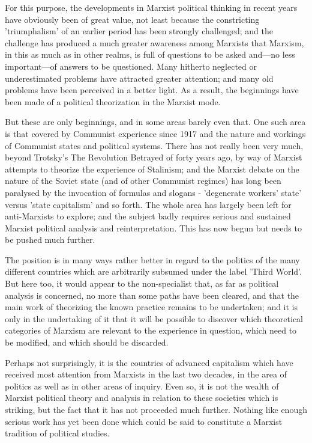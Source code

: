 For this purpose, the developments in Marxist political thinking in recent years have obviously been of great value, not least because the constricting 'triumphalism' of an earlier period has been strongly challenged; and the challenge has produced a much greater awareness among Marxists that Marxism, in this as much as in other realms, is full of questions to be asked and—no less important—of answers to be questioned. Many hitherto neglected or underestimated problems have attracted greater attention; and many old problems have been perceived in a better light. As a result, the beginnings have been made of a political theorization in the Marxist mode.

But these are only beginnings, and in some areas barely even that. One such area is that covered by Communist experience since 1917 and the nature and workings of Communist states and political systems. There has not really been very much, beyond Trotsky's The Revolution Betrayed of forty years ago, by way of Marxist attempts to theorize the experience of Stalinism; and the Marxist debate on the nature of the Soviet state (and of other Communist regimes) has long been paralysed by the invocation of formulas and slogans - 'degenerate workers' state' versus 'state capitalism' and so forth. The whole area has largely been left for anti-Marxists to explore; and the subject badly requires serious and sustained Marxist political analysis and reinterpretation. This has now begun but needs to be pushed much further.

The position is in many ways rather better in regard to the politics of the many different countries which are arbitrarily subsumed under the label 'Third World'. But here too, it would appear to the non-specialist that, as far as political analysis is concerned, no more than some paths have been cleared, and that the main work of theorizing the known practice remains to be undertaken; and it is only in the undertaking of it that it will be possible to discover which theoretical categories of Marxism are relevant to the experience in question, which need to be modified, and which should be discarded.

Perhaps not surprisingly, it is the countries of advanced capitalism which have received most attention from Marxists in the last two decades, in the area of politics as well as in other areas of inquiry. Even so, it is not the wealth of Marxist political theory and analysis in relation to these societies which is striking, but the fact that it has not proceeded much further. Nothing like enough serious work has yet been done which could be said to constitute a Marxist tradition of political studies.

